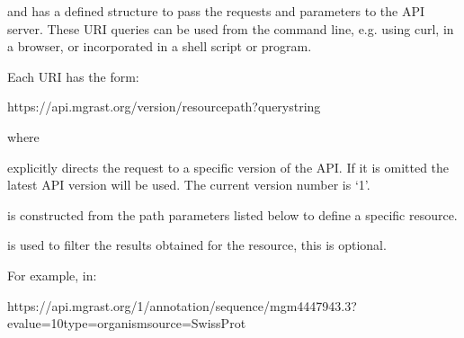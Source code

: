 \documentclass[letterpaper,10pt,english]{sphinxmanual}
\begin{document}
\begin{sphinxVerbatim}[commandchars=\\\{\}]
\end{sphinxVerbatim}

and has a defined structure to pass the requests and parameters to the
API server. These URI queries can be used from the command line, e.g.
using curl, in a browser, or incorporated in a shell script or program.

Each URI has the form:

\begin{sphinxVerbatim}[commandchars=\\\{\}]
https://api.mg\PYGZhy{}rast.org/\PYGZob{}version\PYGZcb{}/\PYGZob{}resourcepath\PYGZcb{}?\PYGZob{}querystring\PYGZcb{}
\end{sphinxVerbatim}

where

\begin{sphinxVerbatim}[commandchars=\\\{\}]
\end{sphinxVerbatim}

explicitly directs the request to a specific version of the API. If it
is omitted the latest API version will be used. The current version
number is ‘1’.

\begin{sphinxVerbatim}[commandchars=\\\{\}]
\end{sphinxVerbatim}

is constructed from the path parameters listed below to define a
specific resource.

\begin{sphinxVerbatim}[commandchars=\\\{\}]
\end{sphinxVerbatim}

is used to filter the results obtained for the resource, this is
optional.

For example, in:

\begin{sphinxVerbatim}[commandchars=\\\{\}]
https://api.mg\PYGZhy{}rast.org/1/annotation/sequence/mgm4447943.3?evalue=10\PYGZam{}type=organism\PYGZam{}source=SwissProt
\end{sphinxVerbatim}
\end{document}
